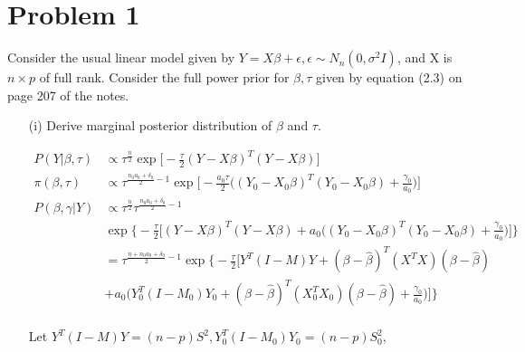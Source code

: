 
\section{Problem 1}
Consider the usual linear model given by $Y = X \beta + \epsilon, \epsilon \sim N_n(0, \sigma^2 I)$, and X is $n \times p$ of full rank. Consider the full power prior for $\beta, \tau$ given by equation (2.3) on page 207 of the notes.

\begin{itemize}
\item[(i)] Derive marginal posterior distribution of $\beta$ and $\tau$.

\begin{align*}
	P(Y | \beta, \tau) & \propto \tau^{\frac{n}{2}} \exp \Big[-\frac{\tau}{2} (Y- X \beta)^T (Y- X \beta) \Big] \\
	\pi(\beta, \tau) & \propto \tau^{\frac{n_0 a_0 + \delta_0}{2} -1} \exp \Big[ -\frac{a_0 \tau}{2} \Big( (Y_0 - X_0 \beta)^T (Y_0 - X_0 \beta) + \frac{\gamma_0}{a_0} \Big) \Big] \\
	P(\beta, \gamma | Y) & \propto \tau^{\frac{n}{2}} \tau^{\frac{n_0 a_0 + \delta_0}{2} -1} \\
	& \exp \Big \{  -\frac{\tau}{2} \Big[ (Y- X \beta)^T (Y- X \beta) + a_0 \Big( (Y_0 - X_0 \beta)^T (Y_0 - X_0 \beta) + \frac{\gamma_0}{a_0} \Big)  \Big ] \Big  \} \\
	&= \tau^{\frac{n + n_0 a_0 + \delta_0}{2} -1} \exp \Big \{  -\frac{\tau}{2} \Big[ Y^T(I-M)Y + (\beta - \hat{\beta})^T(X^T X) (\beta - \hat{\beta}) \\
	& + a_0 \Big( Y_0^T(I-M_0)Y_0 + (\beta - \hat{\beta})^T(X_0^T X_0) (\beta - \hat{\beta})  + \frac{\gamma_0}{a_0} \Big)  \Big ] \Big  \} \\
 \end{align*}

Let $Y^T(I-M)Y = (n-p) S^2, Y_0^T(I-M_0)Y_0 = (n-p) S_0^2$, 


\end{itemize}
